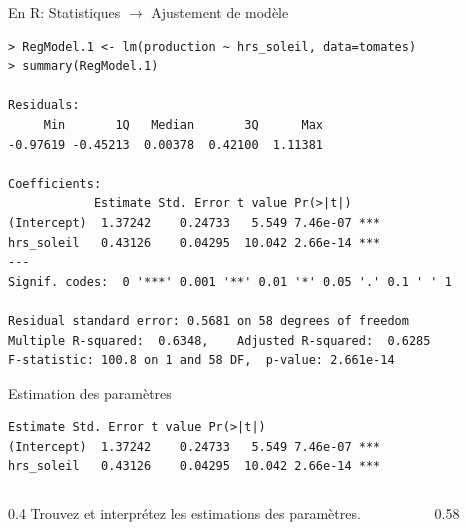 \documentclass{BeamerTemplate}
\begin{document}
\begin{frame}[fragile,t]{En R: \textsf{Statistiques} $\rightarrow$ \textsf{Ajustement de modèle}}

\begin{Verbatim}[fontsize=\scriptsize]
> RegModel.1 <- lm(production ~ hrs_soleil, data=tomates)
> summary(RegModel.1)

Residuals:
     Min       1Q   Median       3Q      Max
-0.97619 -0.45213  0.00378  0.42100  1.11381

Coefficients:
            Estimate Std. Error t value Pr(>|t|)
(Intercept)  1.37242    0.24733   5.549 7.46e-07 ***
hrs_soleil   0.43126    0.04295  10.042 2.66e-14 ***
---
Signif. codes:  0 '***' 0.001 '**' 0.01 '*' 0.05 '.' 0.1 ' ' 1

Residual standard error: 0.5681 on 58 degrees of freedom
Multiple R-squared:  0.6348,    Adjusted R-squared:  0.6285
F-statistic: 100.8 on 1 and 58 DF,  p-value: 2.661e-14
\end{Verbatim}

\end{frame}

\begin{frame}[fragile,t]{Estimation des paramètres}

\begin{Verbatim}[fontsize=\scriptsize]
            Estimate Std. Error t value Pr(>|t|)
(Intercept)  1.37242    0.24733   5.549 7.46e-07 ***
hrs_soleil   0.43126    0.04295  10.042 2.66e-14 ***
\end{Verbatim}

\begin{columns}[T]
\begin{column}{0.4\textwidth}
\vspace{5mm}
Trouvez et interprétez les estimations des paramètres.
\end{column}
\begin{column}{0.58\textwidth}
\end{column}
\end{columns}

\end{frame}
\end{document}
